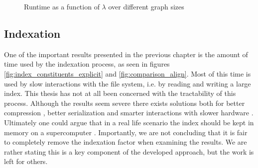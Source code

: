 \documentclass[thesis.tex]{subfiles}
\begin{document}
\begin{figure}
\caption[Runtime as a function of $\lambda$ over different graph sizes]{Runtime as a function of $\lambda$ over different graph sizes}
\label{fig:projected_lambda}
\end{figure}
\subsection*{Indexation}
\label{sec:discussion_indexation}
One of the important results presented in the previous chapter is the amount of time used by the indexation process, as seen in figures \ref{fig:index_constituents_explicit} and \ref{fig:comparison_align}. Most of this time is used by slow interactions with the file system, i.e. by reading and writing a large index. This thesis has not at all been concerned with the tractability of this process. Although the results seem severe there exists solutions both for better compression \cite{a_block_sorting_lossless_data_compression_algorithm}\cite{compression}, better serialization \cite{jvm_serialization} and smarter interactions with slower hardware \cite[Section 4.7]{data_structures_and_algorithm_analysis_in_java}. Ultimately one could argue that in a real life scenario the index should be kept in memory on a supercomputer \cite{multiple_sequence_alignment_on_supercomputers}\cite{supercomputer}. Importantly, we are not concluding that it is fair to completely remove the indexation factor when examining the results. We are rather stating this is a key component of the developed approach, but the work is left for others.
\end{document}
